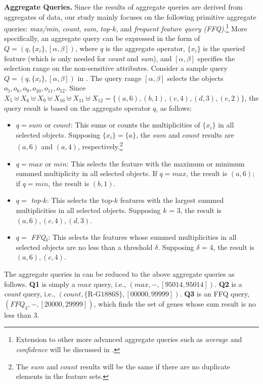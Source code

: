 \textbf{Aggregate Queries.} Since the results of aggregate queries are derived from aggregates of data, our study mainly focuses on the following primitive aggregate queries: \emph{max/min}, \emph{count}, \emph{sum}, \emph{top-$k$}, and \emph{frequent feature query (FFQ)}.\footnote{Extension to other more advanced aggregate queries such as \emph{average} and \emph{confidence} will be discussed in .}  More specifically,  an aggregate query can be expressed in the form of $Q = (q, \{x_i\}, [\alpha, \beta])$, where $q$ is the aggregate operator, $\{x_i\}$ is the queried feature (which is only needed for \emph{count} and \emph{sum}), and $[\alpha, \beta]$ specifies the selection range on the non-sensitive attributes. Consider a sample query $Q = (q, \{x_i\}, [\alpha, \beta])$ in . The query range $[\alpha, \beta]$ selects the objects $o_5, o_6, o_9, o_{10}, o_{11}, o_{12}$. Since $X _5 \uplus X_6 \uplus X_9 \uplus X_{10} \uplus X_{11} \uplus X_{12} = \{(a, 6), (b, 1), (c, 4), (d, 3), (e, 2)\}$, the query result is based on the aggregate operator $q$, as follows:
\begin{itemize}
  \item $q=sum$ or $count$: This sums or counts the multiplicities of $\{x_i\}$ in all selected objects. Supposing $\{x_i\} = \{a\}$, the $sum$ and $count$ results are $(a, 6)$ and $(a, 4)$, respectively.\footnote{The $sum$ and $count$ results will be the same if there are no duplicate elements in the feature sets.}
  \item $q=max$ or $min$: This selects the feature with the maximum or minimum summed multiplicity in all selected objects. If $q=max$, the result is $(a, 6)$; if $q=min$, the result is $(b, 1)$. %
  \item $q=$ \emph{top-$k$}: This selects the top-$k$ features with the largest summed multiplicities in all selected objects. Supposing $k$ = 3, the result is $(a, 6), (c, 4), (d, 3)$.
  \item $q=$ \emph{FFQ$_\delta$}: This selects the features whose summed multiplicities in all selected objects are no less than a threshold $\delta$. Supposing $\delta$ = 4, the result is $(a, 6), (c, 4)$.
\end{itemize}

The aggregate queries in  can be reduced to the above aggregate queries as follows. \textbf{Q1} is simply a $max$ query, i.e., $(max, -, [95014, 95014])$. \textbf{Q2} is a \emph{count} query, i.e., $(count, \{\text{R-G1886S}\}, [00000, 99999])$. \textbf{Q3} is an FFQ query, $(FFQ_3, -, [20000, 29999])$, which finds the set of genes whose sum result is no less than 3. %

